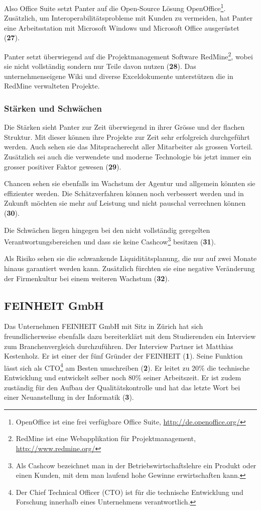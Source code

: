 Also Office Suite setzt Panter auf die Open-Source
Lösung OpenOffice\footnote{OpenOffice ist eine frei verfügbare Office Suite, 
\url{http://de.openoffice.org/}}. Zusätzlich, um Interoperabilitätsprobleme
mit Kunden zu vermeiden, hat Panter eine Arbeitsstation mit Microsoft Windows
und Microsoft Office ausgerüstet (\textbf{27}).

Panter setzt überwiegend auf die Projektmanagement Software RedMine\footnote{RedMine
ist eine Webapplikation für Projektmanagement, \url{http://www.redmine.org/}},
wobei sie nicht vollständig sondern nur Teile davon nutzen (\textbf{28}). 
Das unternehmenseigene Wiki und diverse Exceldokumente unterstützen die in RedMine
verwalteten Projekte. 

\subsubsection{Stärken und Schwächen}
Die Stärken sieht Panter zur Zeit überwiegend in ihrer Grösse und der flachen
Struktur. Mit dieser können ihre Projekte zur Zeit sehr erfolgreich durchgeführt 
werden. Auch sehen sie das Mitspracherecht aller Mitarbeiter als grossen Vorteil.
Zusätzlich sei auch die verwendete und moderne Technologie bis jetzt immer
ein grosser positiver Faktor gewesen (\textbf{29}).

Chancen sehen sie ebenfalls im Wachstum der Agentur und allgemein könnten
sie effizienter werden. Die Schätzverfahren können noch verbessert werden und
in Zukunft möchten sie mehr auf Leistung und nicht pauschal verrechnen können (\textbf{30}).

Die Schwächen liegen hingegen bei den nicht vollständig geregelten 
Verantwortungsbereichen und dass sie keine Cashcow\footnote{Als Cashcow bezeichnet
man in der Betriebswirtschaftslehre ein Produkt oder einen Kunden, mit dem man
laufend hohe Gewinne erwirtschaften kann.} besitzen (\textbf{31}).

Als Risiko sehen sie die schwankende Liquiditätsplanung, die nur auf zwei Monate 
hinaus garantiert werden kann. Zusätzlich fürchten sie eine negative Veränderung 
der Firmenkultur bei einem weiteren Wachstum (\textbf{32}).

\subsection{FEINHEIT GmbH}
Das Unternehmen FEINHEIT GmbH mit Sitz in Zürich hat sich freundlicherweise
ebenfalls dazu bereiterklärt mit dem Studierenden ein Interview zum Branchenvergleich
durchzuführen. Der Interview Partner ist Matthias Kestenholz. Er ist einer der
fünf Gründer der FEINHEIT (\textbf{1}). Seine Funktion lässt sich als CTO\footnote{Der Chief Technical Officer (CTO) ist
für die technische Entwicklung und Forschung innerhalb eines Unternehmens
verantwortlich.} am Besten umschreiben (\textbf{2}). Er leitet zu 20\% die
technische Entwicklung und entwickelt selber noch 80\% seiner Arbeitszeit. Er
ist zudem zuständig für den Aufbau der Qualitätskontrolle und hat das letzte
Wort bei einer Neuanstellung in der Informatik (\textbf{3}).

